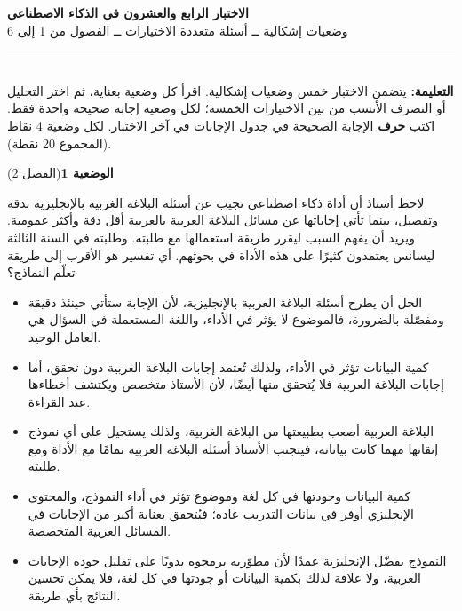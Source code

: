 \documentclass[11pt,a4paper]{article}
\begin{document}
\linespread{1.08}\selectfont
\begin{center}
{\LARGE\khatt\textbf{الاختبار الرابع والعشرون في الذكاء الاصطناعي}}\\[4pt]
{\normalsize وضعيات إشكالية ــ أسئلة متعددة الاختيارات ــ الفصول من 1 إلى 6}
\end{center}
\vspace{-2pt}\rule{\textwidth}{0.6pt}\\[2pt]
\textbf{التعليمة:} يتضمن الاختبار خمس وضعيات إشكالية. اقرأ كل وضعية بعناية، ثم اختر التحليل أو التصرف الأنسب
من بين الاختيارات الخمسة؛ لكل وضعية إجابة صحيحة واحدة فقط.
اكتب \textbf{حرف} الإجابة الصحيحة في جدول الإجابات في آخر الاختبار.
لكل وضعية 4 نقاط (المجموع 20 نقطة).
\vspace{4pt}

\noindent
{\large\khatt\textbf{الوضعية 1}}\hfill{\small(الفصل 2)}\par\nopagebreak\vspace{3pt}
\setlength{\fboxsep}{7pt}\colorbox{gray!10}{\parbox{\dimexpr\linewidth-14pt}{لاحظ أستاذ أن أداة ذكاء اصطناعي تجيب عن أسئلة البلاغة الغربية بالإنجليزية بدقة وتفصيل، بينما تأتي إجاباتها عن مسائل البلاغة العربية بالعربية أقل دقة وأكثر عمومية. ويريد أن يفهم السبب ليقرر طريقة استعمالها مع طلبته. وطلبته في السنة الثالثة ليسانس يعتمدون كثيرًا على هذه الأداة في بحوثهم. أي تفسير هو الأقرب إلى طريقة تعلّم النماذج؟}}\par\nopagebreak
\begin{itemize}[leftmargin=1.0cm, labelsep=6pt, itemsep=3pt, topsep=4pt, parsep=0pt]
  \item[\textbf{أ)}] الحل أن يطرح أسئلة البلاغة العربية بالإنجليزية، لأن الإجابة ستأتي حينئذ دقيقة ومفصّلة بالضرورة، فالموضوع لا يؤثر في الأداء، واللغة المستعملة في السؤال هي العامل الوحيد.
  \item[\textbf{ب)}] كمية البيانات تؤثر في الأداء، ولذلك تُعتمد إجابات البلاغة الغربية دون تحقق، أما إجابات البلاغة العربية فلا يُتحقق منها أيضًا، لأن الأستاذ متخصص ويكتشف أخطاءها عند القراءة.
  \item[\textbf{ج)}] البلاغة العربية أصعب بطبيعتها من البلاغة الغربية، ولذلك يستحيل على أي نموذج إتقانها مهما كانت بياناته، فيتجنب الأستاذ أسئلة البلاغة العربية تمامًا مع الأداة ومع طلبته.
  \item[\textbf{د)}] كمية البيانات وجودتها في كل لغة وموضوع تؤثر في أداء النموذج، والمحتوى الإنجليزي أوفر في بيانات التدريب عادة؛ فيُتحقق بعناية أكبر من الإجابات في المسائل العربية المتخصصة.
  \item[\textbf{هـ)}] النموذج يفضّل الإنجليزية عمدًا لأن مطوّريه برمجوه يدويًا على تقليل جودة الإجابات العربية، ولا علاقة لذلك بكمية البيانات أو جودتها في كل لغة، فلا يمكن تحسين النتائج بأي طريقة.
\end{itemize}
\end{document}
